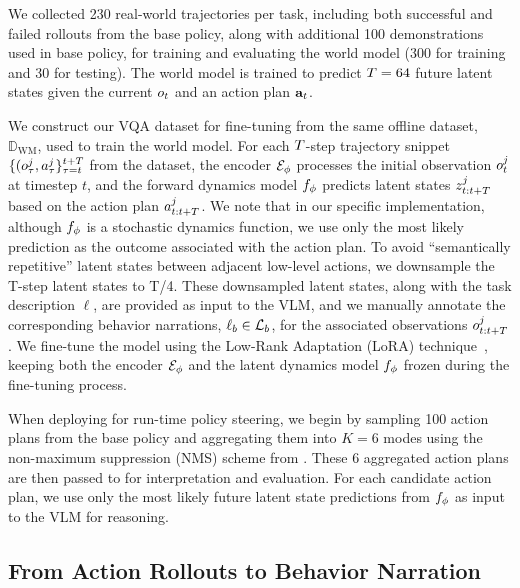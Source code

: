 We collected 230 real-world trajectories per task, including both successful and failed rollouts from the base policy, along with additional 100 demonstrations used in base policy, for training and evaluating the world model (300 for training and 30 for testing).
The world model is trained to predict $T=64$ future latent states 
given the current $o_t$ and an action plan $\mathbf{a}_t$. %

 We construct our VQA dataset for fine-tuning from the same offline dataset, $\mathbb{D}_{\text{WM}}$, used to train the world model. 
For each $T$-step trajectory snippet  $ \{(o_\tau^j, a_\tau^j\}_{\tau=t}^{t+T}$ from the dataset, the encoder $\mathcal{E}_\phi$ processes the initial observation $o_t^j$ at timestep $t$, and the forward dynamics model $f_\phi$ predicts latent states $z^j_{t:t+T}$ based on the action plan $a^j_{t:t+T}$. We note that in our specific implementation, although $f_\phi$ is a stochastic dynamics function, we use only the most likely prediction as the outcome associated with the action plan. To avoid ``semantically repetitive'' latent states between adjacent low-level actions, we downsample the T-step latent states to T/4.  
These downsampled latent states, along with the task description $\ell$, are provided as input to the VLM, and we manually annotate the corresponding behavior narrations, $\ell_b \in \mathcal{L}_{b}$, for the associated observations $o_{t:t+T}^j$.
We fine-tune the model using the Low-Rank Adaptation (LoRA) technique~\citep{hu2022lora}, keeping both the encoder $\mathcal{E}_\phi$ and the latent dynamics model $f_\phi$ frozen during the fine-tuning process.

 When deploying \ours for run-time policy steering, we begin by sampling 100 action plans from the base policy and aggregating them into $K=6$ modes using the non-maximum suppression (NMS) scheme from \cite{seff2023motionlm}. These 6 aggregated action plans are then passed to \ours for interpretation and evaluation. 
For each candidate action plan, we use only the most likely future latent state predictions from $f_\phi$ as input to the VLM for reasoning.










\subsection{From Action Rollouts to Behavior Narration}\label{sec:behavior}

